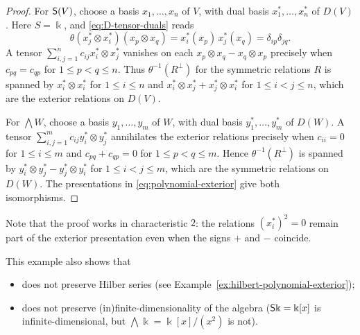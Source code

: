 \begin{proof}
For $\mathsf{S}(V)$, choose a basis $x_1,\ldots,x_n$ of $V$, with dual basis $x_1^*,\ldots,x_n^*$ of $D(V)$.
Here $S=\Bbbk$, and \eqref{eq:D-tensor-duals} reads
\[
\theta(x_j^*\otimes x_i^*)(x_p\otimes x_q)=x_i^*(x_p)\,x_j^*(x_q)=\delta_{ip}\delta_{jq}.
\]
A tensor $\sum_{i,j=1}^n c_{ij}x_i^*\otimes x_j^*$ vanishes on each $x_p\otimes x_q-x_q\otimes x_p$ precisely when $c_{pq}=c_{qp}$ for $1\leq p<q\leq n$.
Thus $\theta^{-1}(R^\perp)$ for the symmetric relations $R$ is spanned by $x_i^*\otimes x_i^*$ for $1\leq i\leq n$ and $x_i^*\otimes x_j^*+x_j^*\otimes x_i^*$ for $1\leq i<j\leq n$, which are the exterior relations on $D(V)$.

For $\bigwedge W$, choose a basis $y_1,\ldots,y_m$ of $W$, with dual basis $y_1^*,\ldots,y_m^*$ of $D(W)$.
A tensor $\sum_{i,j=1}^m c_{ij}y_i^*\otimes y_j^*$ annihilates the exterior relations precisely when $c_{ii}=0$ for $1\leq i\leq m$ and $c_{pq}+c_{qp}=0$ for $1\leq p<q\leq m$.
Hence $\theta^{-1}(R^\perp)$ is spanned by $y_i^*\otimes y_j^*-y_j^*\otimes y_i^*$ for $1\leq i<j\leq m$, which are the symmetric relations on $D(W)$.
The presentations in \eqref{eq:polynomial-exterior} give both isomorphisms.
\end{proof}

Note that the proof works in characteristic $2$: the relations $(x_i^*)^2=0$ remain part of the exterior presentation even when the signs $+$ and $-$ coincide.

This example also shows that
\begin{itemize}
\item does not preserve Hilber series (see Example~\ref{ex:hilbert-polynomial-exterior});

\item does not preserve (in)finite-dimensionality of the algebra ($\mathsf{S}\Bbbk=\Bbbk[x]$ is infinite-dimensional, but $\bigwedge\Bbbk=\Bbbk[x]/(x^2)$ is not).
\end{itemize}

